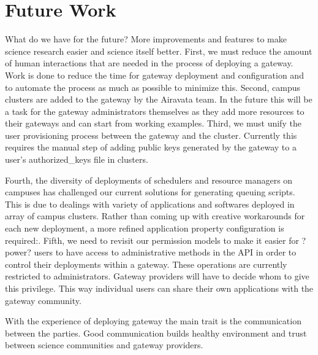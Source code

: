 \documentclass[sigconf]{acmart}
\begin{document}
\section{Future Work}

What do we have for the future? More improvements and features to make science research easier and science itself better. First, we must reduce the amount of human interactions that are needed in the process of deploying a gateway. Work is done to reduce the time for gateway deployment and configuration and to automate the process as much as possible to minimize this. Second, campus clusters are added to the gateway by the Airavata team.  In the future this will be a task for the gateway administrators themselves as they add more resources to their gateways and can start from working examples.  Third, we must unify the user provisioning process between the gateway and the cluster.  Currently this requires the manual step of adding public keys generated by the gateway to a user's authorized\_keys file in clusters.

Fourth, the diversity of deployments of schedulers and resource managers on campuses has challenged our current solutions for generating queuing scripts. This is due to dealings with variety of applications and softwares deployed in array of campus clusters. Rather than coming up with creative workarounds for each new deployment, a more refined application property configuration is required:. Fifth, we need to revisit our permission models to make it easier for ?power? users to have access to administrative methods in the API in order to control their deployments within a gateway. These operations are currently restricted to administrators. Gateway providers will have to decide whom to give this privilege. This way individual users can share their own applications with the gateway community.

With the experience of deploying gateway the main trait is the communication between the parties. Good communication builds healthy environment and trust between science communities and gateway providers.


%
%



\end{document}
